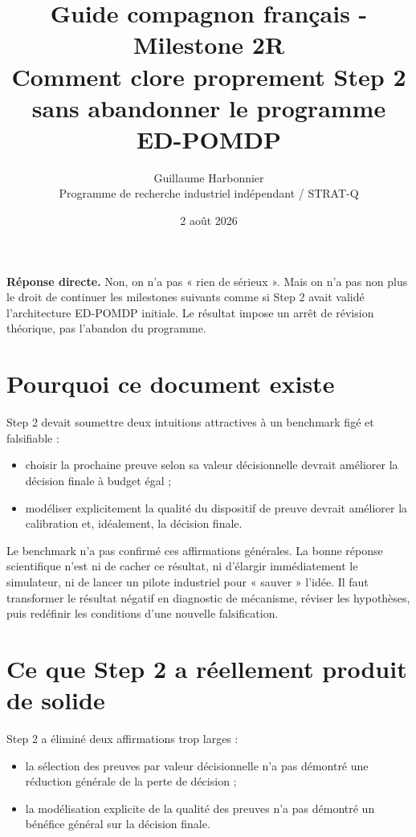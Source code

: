 \documentclass[11pt,a4paper]{article}
\title{\textbf{Guide compagnon français - Milestone 2R}\\
\large Comment clore proprement Step 2 sans abandonner le programme ED-POMDP}
\author{Guillaume Harbonnier\\Programme de recherche industriel indépendant / STRAT-Q}
\date{2 août 2026}
\begin{document}
\maketitle

\begin{tcolorbox}[colback=softblue,colframe=deepblue,boxrule=0.8pt,arc=2mm]
\textbf{Réponse directe.} Non, on n'a pas « rien de sérieux ». Mais on n'a pas non plus le droit de continuer les milestones suivants comme si Step 2 avait validé l'architecture ED-POMDP initiale. Le résultat impose un arrêt de révision théorique, pas l'abandon du programme.
\end{tcolorbox}

\section{Pourquoi ce document existe}

Step 2 devait soumettre deux intuitions attractives à un benchmark figé et falsifiable :
\begin{itemize}
  \item choisir la prochaine preuve selon sa valeur décisionnelle devrait améliorer la décision finale à budget égal ;
  \item modéliser explicitement la qualité du dispositif de preuve devrait améliorer la calibration et, idéalement, la décision finale.
\end{itemize}

Le benchmark n'a pas confirmé ces affirmations générales. La bonne réponse scientifique n'est ni de cacher ce résultat, ni d'élargir immédiatement le simulateur, ni de lancer un pilote industriel pour « sauver » l'idée. Il faut transformer le résultat négatif en diagnostic de mécanisme, réviser les hypothèses, puis redéfinir les conditions d'une nouvelle falsification.

\section{Ce que Step 2 a réellement produit de solide}

Step 2 a éliminé deux affirmations trop larges :
\begin{itemize}
  \item la sélection des preuves par valeur décisionnelle n'a pas démontré une réduction générale de la perte de décision ;
  \item la modélisation explicite de la qualité des preuves n'a pas démontré un bénéfice général sur la décision finale.
\end{itemize}
\end{document}
